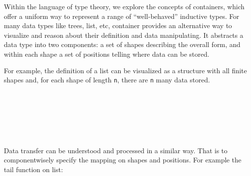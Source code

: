 Within the language of type theory, we explore the concepts of containers, which offer a uniform way to represent a range of ``well-behaved'' inductive types. For many data types like trees, list, etc, container provides an alternative way to visualize and reason about their definition and data manipulating. It abstracts a data type into two components: a set of shapes describing the overall form, and within each shape a set of positions telling where data can be stored.

For example, the definition of a list can be visualized as a structure with all finite shapes and, for each shape of length \texttt{n}, there are \texttt{n} many data stored.

\begin{code}%
\>[0]\AgdaSpace{}%
\AgdaSpace{}%
\AgdaSymbol{(}\AgdaSpace{}%
\AgdaSymbol{:}\AgdaSpace{}%
\AgdaSymbol{)}\AgdaSpace{}%
\AgdaSymbol{:}\AgdaSpace{}%
\AgdaSpace{}%
\<%
\\
\>[0][@{}l@{\AgdaIndent{0}}]%
\>[2]\AgdaSpace{}%
\AgdaSymbol{:}\AgdaSpace{}%
\AgdaSpace{}%
\<%
\\
%
\>[2]\AgdaSpace{}%
\AgdaSymbol{:}\AgdaSpace{}%
\AgdaSpace{}%
\AgdaSpace{}%
\AgdaSpace{}%
\<%
\\
%
\>[2]\AgdaSpace{}%
\AgdaSymbol{:}\AgdaSpace{}%
\AgdaSpace{}%
\AgdaSpace{}%
\AgdaSpace{}%
\AgdaSpace{}%
\AgdaSpace{}%
\<%
\\
%
\>[2]\AgdaSpace{}%
\AgdaSymbol{:}\AgdaSpace{}%
\AgdaSpace{}%
\AgdaSpace{}%
\AgdaSpace{}%
\AgdaSpace{}%
\AgdaSpace{}%
\AgdaSpace{}%
\AgdaSpace{}%
\<%
\\
%
\>[2]\<%
\end{code}

Data transfer can be understood and processed in a similar way. That is to componentwisely specify the mapping on shapes and positions. For example the tail function on list:

